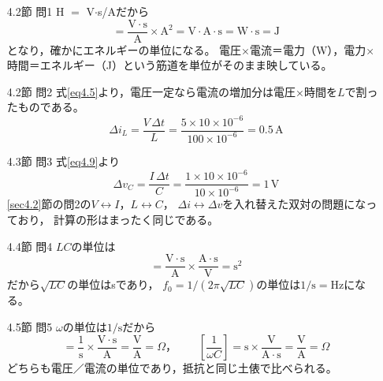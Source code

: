 \answer
\begin{enumerate}

\item[4.2節 問1]
H $=$ V$\cdot$s/Aだから
\begin{equation*}
[LI^2] = \frac{\mathrm{V\cdot s}}{\mathrm{A}}\times\mathrm{A}^2
= \mathrm{V\cdot A\cdot s} = \mathrm{W\cdot s} = \mathrm{J}
\end{equation*}
となり，確かにエネルギーの単位になる。
電圧×電流＝電力（W），電力×時間＝エネルギー（J）という筋道を単位がそのまま映している。

\item[4.2節 問2]
式\ref{eq4.5}より，電圧一定なら電流の増加分は電圧×時間を$L$で割ったものである。
\begin{equation*}
\mathit{\Delta}i_L = \frac{V\,\mathit{\Delta}t}{L}
= \frac{5\times10\times10^{-6}}{100\times10^{-6}} = 0.5\,\mathrm{A}
\end{equation*}

\item[4.3節 問3]
式\ref{eq4.9}より
\begin{equation*}
\mathit{\Delta}v_C = \frac{I\,\mathit{\Delta}t}{C}
= \frac{1\times10\times10^{-6}}{10\times10^{-6}} = 1\,\mathrm{V}
\end{equation*}
\ref{sec4.2}節の問2の$V \leftrightarrow I$，$L \leftrightarrow C$，
$\mathit{\Delta}i \leftrightarrow \mathit{\Delta}v$を入れ替えた双対の問題になっており，
計算の形はまったく同じである。

\item[4.4節 問4]
$LC$の単位は
\begin{equation*}
[LC] = \frac{\mathrm{V\cdot s}}{\mathrm{A}}\times\frac{\mathrm{A\cdot s}}{\mathrm{V}}
= \mathrm{s}^2
\end{equation*}
だから$\sqrt{LC}$の単位はsであり，
$f_0 = 1/(2\pi\sqrt{LC})$の単位は$1/\mathrm{s} = \mathrm{Hz}$になる。

\item[4.5節 問5]
$\omega$の単位は$1/\mathrm{s}$だから
\begin{equation*}
[\omega L] = \frac{1}{\mathrm{s}}\times\frac{\mathrm{V\cdot s}}{\mathrm{A}}
= \frac{\mathrm{V}}{\mathrm{A}} = \Omega，\qquad
\left[\frac{1}{\omega C}\right]
= \mathrm{s}\times\frac{\mathrm{V}}{\mathrm{A\cdot s}}
= \frac{\mathrm{V}}{\mathrm{A}} = \Omega
\end{equation*}
どちらも電圧／電流の単位であり，抵抗と同じ土俵で比べられる。

\end{enumerate}
